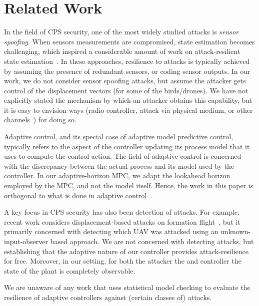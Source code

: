 \vspace*{-0.6ex}
\section{Related Work}
\label{sec:related}

In the field of CPS security, one of the most widely studied attacks is \emph{sensor spoofing}.  When sensors measurements are compromised, state estimation becomes challenging, which inspired a considerable amount of work on attack-resilient state estimation~\cite{DBLP:journals/tac/FawziTD14,Bullo13:TAC,Pajic14:ICCPS,Pajic15:ICCPS,UAVspoofing}.
In these approaches, resilience to attacks is typically achieved by assuming the presence of redundant sensors, or coding sensor outputs.
In our work, we do not consider sensor spoofing attacks, but assume the attacker gets control of the displacement vectors (for some of the birds/drones).  We have not explicitly stated the mechanism by which an attacker obtains this capability, but it is easy to envision ways (radio controller, attack via physical medium, or other channels~\cite{savage}) for doing so.

Adaptive control, and its special case of adaptive model predictive control, typically refers to the aspect of the controller updating its process model that it uses to compute the control action. The field of adaptive control is concerned with the discrepancy between the actual process and its model used by the controller. In our adaptive-horizon MPC, we adapt the lookahead horizon employed by the MPC, and not the model itself.  Hence, the work in this paper is orthogonal to what is done in adaptive control~\cite{adaptive_control,adaptive_mpc}.

A key focus in CPS security has also been detection of attacks. For example, recent work considers displacement-based attacks on formation flight~\cite{aiaa2016}, but it primarily concerned with detecting which UAV was attacked using an unknown-input-observer based approach. We are not concerned with detecting attacks, but establishing that the adaptive nature of our controller provides attack-resilience for free. Moreover, in our setting, for both the attacker the and controller the state of the plant is completely observable.

We are unaware of any work that uses statistical model checking to evaluate the resilience of adaptive controllers against (certain classes of) attacks.